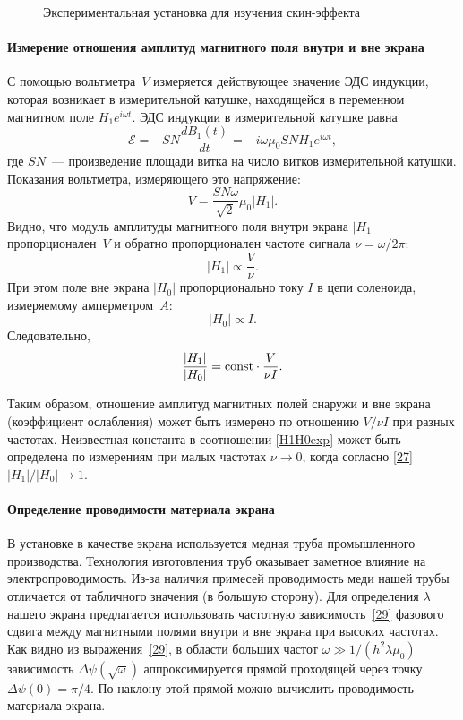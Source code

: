 \begin{figure}[h!]
    \centering
    \caption{Экспериментальная установка для изучения скин-эффекта}
\end{figure}
\paragraph{Измерение отношения амплитуд магнитного поля внутри и вне экрана}

С помощью вольтметра~$V$ измеряется действующее значение ЭДС индукции, 
которая возникает в измерительной катушке, находящейся в переменном магнитном поле
$H_1e^{i\omega t}$.
ЭДС индукции в измерительной катушке равна
\[
\mathcal{E}=-SN\frac{dB_{1}(t)}{dt}=-i\omega \mu_0 S N H_1 e^{i\omega t},
\]
где $SN$~--- произведение площади витка на число витков измерительной катушки. 
Показания вольтметра, измеряющего это напряжение: 
\[
V= \frac{SN\omega}{\sqrt{2}}\mu_0|H_1|.
\]
Видно, что модуль амплитуды магнитного поля внутри экрана $|H_1|$ пропорционален~$V$ 
и обратно пропорционален частоте сигнала $\nu = \omega / 2\pi$:
\[
|H_1|\propto \frac{V}{\nu}.
\]
При этом поле вне экрана $|H_0|$ пропорционально току $I$ в цепи соленоида,
измеряемому амперметром~$A$:
\[
|H_0| \propto I.
\] 
Следовательно, 
\begin{equation} \eqmark{H1H0exp}
\frac{|H_1|}{|H_0|} = \const \cdot \frac{V}{\nu I}.
\end{equation}

Таким образом, отношение амплитуд магнитных полей снаружи и вне экрана
(коэффициент ослабления) может быть измерено
по отношению $V/\nu I$ при разных частотах. Неизвестная константа
в соотношении \eqref{H1H0exp} может быть определена по измерениям 
при малых частотах $\nu \to 0$, когда согласно \eqref{27} $|H_1|/|H_0| \to 1$.


\paragraph{Определение проводимости материала экрана}

В установке в качестве экрана используется медная труба промышленного 
производства. Технология изготовления труб оказывает заметное влияние 
на электропроводимость. Из-за наличия примесей проводимость меди нашей 
трубы отличается от табличного значения (в большую сторону). 
Для определения $\lambda$ нашего экрана предлагается использовать 
частотную зависимость~\eqref{29} фазового сдвига между магнитными полями 
внутри и вне экрана при высоких частотах. Как видно из выражения~\eqref{29}, 
в области больших частот $\omega \gg 1/(h^2\lambda\mu_0)$ зависимость 
$\Delta\psi(\sqrt{\omega})$ аппроксимируется прямой проходящей 
через точку $\Delta\psi(0)=\pi/4$. 
По наклону этой прямой можно вычислить проводимость материала экрана.

